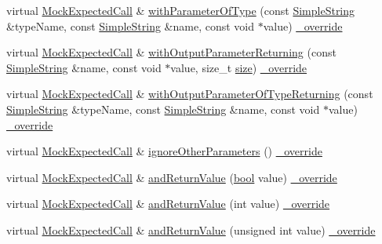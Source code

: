 \begin{DoxyCompactItemize}
\item 
virtual \hyperlink{class_mock_expected_call}{Mock\+Expected\+Call} \& \hyperlink{class_mock_checked_expected_call_a8f5fea7c1dbca849ffd8a46ceaa3ac00}{with\+Parameter\+Of\+Type} (const \hyperlink{class_simple_string}{Simple\+String} \&type\+Name, const \hyperlink{class_simple_string}{Simple\+String} \&name, const void $\ast$value) \hyperlink{_cpp_u_test_config_8h_a049bea15dd750e15869863c94c1efc3b}{\+\_\+override}
\item 
virtual \hyperlink{class_mock_expected_call}{Mock\+Expected\+Call} \& \hyperlink{class_mock_checked_expected_call_a4f3a5314e637a798f9aed13536b8b663}{with\+Output\+Parameter\+Returning} (const \hyperlink{class_simple_string}{Simple\+String} \&name, const void $\ast$value, size\+\_\+t \hyperlink{gst__avb__playbin_8c_a439227feff9d7f55384e8780cfc2eb82}{size}) \hyperlink{_cpp_u_test_config_8h_a049bea15dd750e15869863c94c1efc3b}{\+\_\+override}
\item 
virtual \hyperlink{class_mock_expected_call}{Mock\+Expected\+Call} \& \hyperlink{class_mock_checked_expected_call_a06e26c3b748887a5ad7b696576f0cee3}{with\+Output\+Parameter\+Of\+Type\+Returning} (const \hyperlink{class_simple_string}{Simple\+String} \&type\+Name, const \hyperlink{class_simple_string}{Simple\+String} \&name, const void $\ast$value) \hyperlink{_cpp_u_test_config_8h_a049bea15dd750e15869863c94c1efc3b}{\+\_\+override}
\item 
virtual \hyperlink{class_mock_expected_call}{Mock\+Expected\+Call} \& \hyperlink{class_mock_checked_expected_call_a390cf5728ae3f281e36aeb9e069c35be}{ignore\+Other\+Parameters} () \hyperlink{_cpp_u_test_config_8h_a049bea15dd750e15869863c94c1efc3b}{\+\_\+override}
\item 
virtual \hyperlink{class_mock_expected_call}{Mock\+Expected\+Call} \& \hyperlink{class_mock_checked_expected_call_aa4f0e19f8446f5ff4843f5ab7602b713}{and\+Return\+Value} (\hyperlink{avb__gptp_8h_af6a258d8f3ee5206d682d799316314b1}{bool} value) \hyperlink{_cpp_u_test_config_8h_a049bea15dd750e15869863c94c1efc3b}{\+\_\+override}
\item 
virtual \hyperlink{class_mock_expected_call}{Mock\+Expected\+Call} \& \hyperlink{class_mock_checked_expected_call_a980d2b47c18fde199906572aaa920a00}{and\+Return\+Value} (int value) \hyperlink{_cpp_u_test_config_8h_a049bea15dd750e15869863c94c1efc3b}{\+\_\+override}
\item 
virtual \hyperlink{class_mock_expected_call}{Mock\+Expected\+Call} \& \hyperlink{class_mock_checked_expected_call_ab064498114c11667f281bee69963adbe}{and\+Return\+Value} (unsigned int value) \hyperlink{_cpp_u_test_config_8h_a049bea15dd750e15869863c94c1efc3b}{\+\_\+override}

\end{DoxyCompactItemize}
